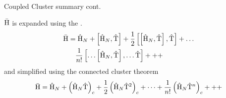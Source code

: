 \begin{frame}{Coupled Cluster summary cont.}

    $\bar{\mathrm{H}}$ is expanded using the \BCH.
    \begin{align*}
        \bar{\mathrm{H}} &= \hat{\mathrm{H}}_N + \left[ \hat{\mathrm{H}}_N, \hat{\mathrm{T}} \right] + 
            \frac{1}{2} \left[\left[ \hat{\mathrm{H}}_N, \hat{\mathrm{T}} \right], \hat{\mathrm{T}}\right] + \ldots \\
            & \quad \frac{1}{n!} \left[ \ldots \left[ \hat{\mathrm{H}}_N, \hat{\mathrm{T}} \right], \ldots \hat{\mathrm{T}} \right] +++
    \end{align*}
    and simplified using the connected cluster theorem
    \begin{equation*}
        \bar{\mathrm{H}} = \hat{\mathrm{H}}_N + \left( \hat{\mathrm{H}}_N \hat{\mathrm{T}}\right)_c + \frac{1}{2} \left( \hat{\mathrm{H}}_N \hat{\mathrm{T}}^2\right)_c
            + \dots + \frac{1}{n!} \left( \hat{\mathrm{H}}_N \hat{\mathrm{T}}^n\right)_c +++
    \end{equation*}
\end{frame}

    
